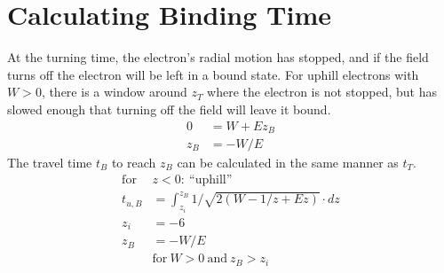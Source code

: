 \documentclass[aps,pra,preprint,groupedaddress]{revtex4-1}
\begin{document}
\section{\label{sec:calcE0} Calculating Binding Time}

At the turning time, the electron's radial motion has stopped, and if the field turns off the electron will be left in a bound state. For uphill electrons with $W > 0$, there is a window around $z_T$ where the electron is not stopped, but has slowed enough that turning off the field will leave it bound.
\begin{align*}
0 & = W + E z_B \\
z_B & = -W/E
\end{align*}
The travel time $t_B$ to reach $z_B$ can be calculated in the same manner as $t_T$.
\begin{align*}
\text{for} ~ & z < 0: ~ \text{``uphill''} \\
t_{u,B} & = \int_{z_i}^{z_B} 1/\sqrt{2(W - 1/z + Ez)} \cdot dz \\
z_i & = -6 \\
z_B & = -W/E \\
 & \text{for} ~ W > 0 ~ \text{and} ~ z_B > z_i
\end{align*}
\end{document}
